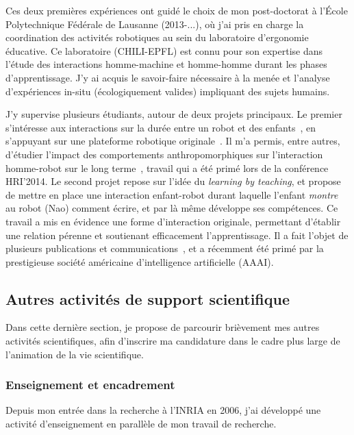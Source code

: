 \documentclass[a4paper]{article}
\begin{document}
Ces deux premières expériences ont guidé le choix de mon post-doctorat à l'École
Polytechnique Fédérale de Lausanne (2013-...), où j'ai pris en charge la
coordination des activités robotiques au sein du laboratoire d'ergonomie
éducative. Ce laboratoire (CHILI-EPFL) est connu pour son expertise dans l'étude
des interactions homme-machine et homme-homme durant les phases d'apprentissage.
J'y ai acquis le savoir-faire nécessaire à la menée et l'analyse d'expériences
in-situ (écologiquement valides) impliquant des sujets humains.

J'y supervise plusieurs étudiants, autour de deux projets principaux. Le
premier s'intéresse aux interactions sur la durée entre un robot et des
enfants~\cite{fink2014which}, en s'appuyant sur une plateforme robotique
originale~\cite{mondada2014ranger}. Il m'a permis, entre autres, d'étudier
l'impact des comportements anthropomorphiques sur l'interaction homme-robot sur
le long terme~\cite{lemaignan2014dynamics,lemaignan2014cognitive}, travail qui a
été primé lors de la conférence HRI'2014. Le second projet repose sur l'idée du
\emph{learning by teaching}, et propose de mettre en place une interaction
enfant-robot durant laquelle l'enfant \emph{montre} au robot (Nao) comment
écrire, et par là même développe ses compétences. Ce travail a mis en évidence
une forme d'interaction originale, permettant d'établir une relation pérenne et
soutienant efficacement l'apprentissage. Il a fait l'objet de plusieurs
publications et
communications~\cite{hood2015when,lemaignan2014taught,hood2015cowriter}, et a
récemment été primé par la prestigieuse société américaine d'intelligence
artificielle (AAAI).

\subsection*{Autres activités de support scientifique}

Dans cette dernière section, je propose de parcourir brièvement mes autres
activités scientifiques, afin d'inscrire ma candidature dans le cadre plus large
de l'animation de la vie scientifique.

\subsubsection*{Enseignement et encadrement}

Depuis mon entrée dans la recherche à l'INRIA en 2006, j'ai développé une
activité d'enseignement en parallèle de mon travail de recherche.
\end{document}
